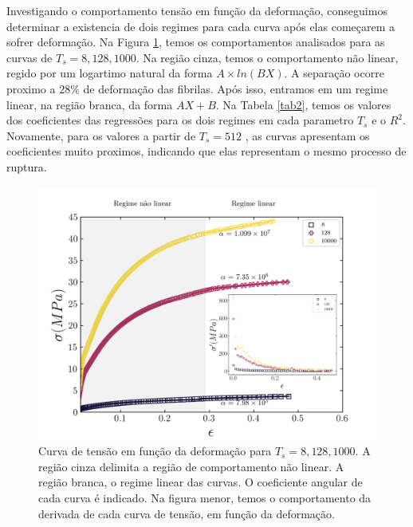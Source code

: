 \documentclass{article}
\begin{document}
    Investigando o comportamento tensão em função da deformação, conseguimos determinar a existencia de dois regimes 
    para cada curva após elas começarem a sofrer deformação. Na Figura \ref{R8}, temos os comportamentos analisados para 
    as curvas de \(T_{s} = 8, 128, 1000\). Na região cinza, temos o comportamento não linear, regido por um logartimo 
    natural da forma \(A\times ln(BX)\). A separação ocorre proximo a \(28 \%\) de deformação das fibrilas. Após isso, 
    entramos em um regime linear, na região branca, da forma \(AX + B\). Na Tabela \ref{tab2}, temos os valores dos coeficientes
    das regressões para os dois regimes em cada parametro \(T_{s}\) e o \(R^{2}\). Novamente, para os valores a partir de \(T_{s} = 512\)
    , as curvas apresentam os coeficientes muito proximos, indicando que elas representam o mesmo processo de ruptura.

    \begin{figure}[H]
        \centering
        \includegraphics[width=\textwidth]{figures/stress_fit.png}

        \caption{Curva de tensão em função da deformação para \(T_{s} = 8, 128, 1000\). A região cinza delimita a 
        região de comportamento não linear. A região branca, o regime linear das curvas. O coeficiente angular de cada 
        curva é indicado. Na figura menor, temos o comportamento da derivada de cada curva de tensão, em função da 
        deformação.} 

        \label{R8}
    \end{figure}
\end{document}
